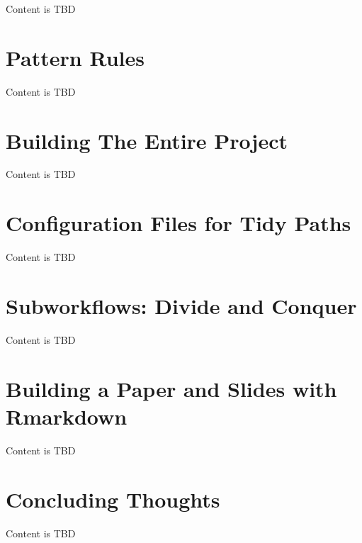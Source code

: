 \documentclass[]{book}
\theoremstyle{definition}
\theoremstyle{definition}
\theoremstyle{definition}
\theoremstyle{remark}
\begin{document}
Content is TBD

\chapter{Pattern Rules}\label{pattern-rules}

Content is TBD

\chapter{Building The Entire Project}\label{building-the-entire-project}

Content is TBD

\chapter{Configuration Files for Tidy
Paths}\label{configuration-files-for-tidy-paths}

Content is TBD

\chapter{Subworkflows: Divide and
Conquer}\label{subworkflows-divide-and-conquer}

Content is TBD

\chapter{Building a Paper and Slides with
Rmarkdown}\label{building-a-paper-and-slides-with-rmarkdown}

Content is TBD

\chapter{Concluding Thoughts}\label{concluding-thoughts}

Content is TBD


\end{document}
